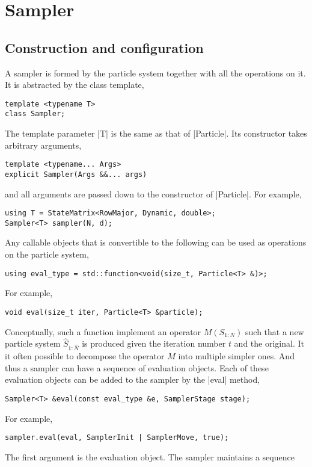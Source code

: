 \section{Sampler}
\label{sec:Sampler}

\subsection{Construction and configuration}
\label{sec:Construction and configuration}

A sampler is formed by the particle system together with all the operations on
it. It is abstracted by the class template,
\begin{verbatim}
template <typename T>
class Sampler;
\end{verbatim}
The template parameter |T| is the same as that of |Particle|. Its constructor
takes arbitrary arguments,
\begin{verbatim}
template <typename... Args>
explicit Sampler(Args &&... args)
\end{verbatim}
and all arguments are passed down to the constructor of |Particle|. For
example,
\begin{verbatim}
using T = StateMatrix<RowMajor, Dynamic, double>;
Sampler<T> sampler(N, d);
\end{verbatim}
Any callable objects that is convertible to the following can be used as
operations on the particle system,
\begin{verbatim}
using eval_type = std::function<void(size_t, Particle<T> &)>;
\end{verbatim}
For example,
\begin{verbatim}
void eval(size_t iter, Particle<T> &particle);
\end{verbatim}
Conceptually, such a function implement an operator $M(S_{1:N})$ such that a
new particle system $\hat{S}_{1:\hat{N}}$ is produced given the iteration
number $t$ and the original. It it often possible to decompose the operator $M$
into multiple simpler ones. And thus a sampler can have a sequence of
evaluation objects. Each of these evaluation objects can be added to the
sampler by the |eval| method,
\begin{verbatim}
Sampler<T> &eval(const eval_type &e, SamplerStage stage);
\end{verbatim}
For example,
\begin{verbatim}
sampler.eval(eval, SamplerInit | SamplerMove, true);
\end{verbatim}
The first argument is the evaluation object. The sampler maintains a sequence
